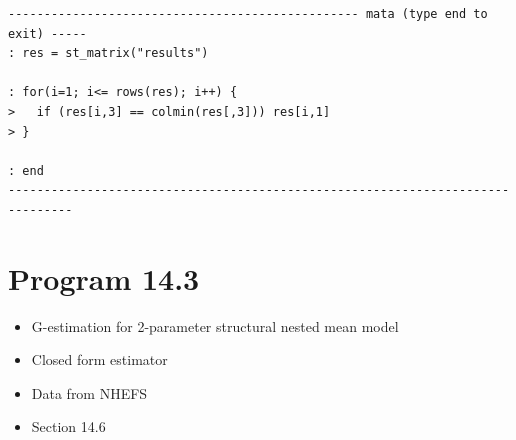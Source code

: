 \documentclass[
  10pt,
]{book}
\providecommand{\tightlist}{%
  \setlength{\itemsep}{0pt}\setlength{\parskip}{0pt}}
\begin{document}
\begin{verbatim}
------------------------------------------------- mata (type end to exit) -----
: res = st_matrix("results")

: for(i=1; i<= rows(res); i++) { 
>   if (res[i,3] == colmin(res[,3])) res[i,1]
> }

: end
-------------------------------------------------------------------------------
\end{verbatim}

\hypertarget{program-14.3-1}{%
\section{Program 14.3}\label{program-14.3-1}}

\begin{itemize}
\tightlist
\item
  G-estimation for 2-parameter structural nested mean model
\item
  Closed form estimator
\item
  Data from NHEFS
\item
  Section 14.6
\end{itemize}
\end{document}
